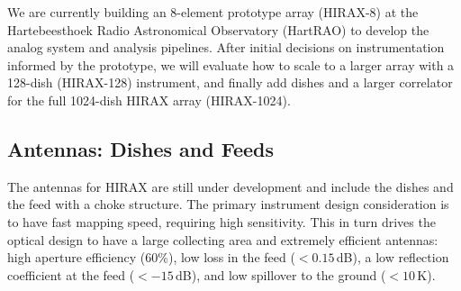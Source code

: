 \documentclass[]{spie}  %
\begin{document}
We are currently building an 8-element prototype array (HIRAX-8) at the Hartebeesthoek Radio Astronomical Observatory (HartRAO) to develop the analog system and analysis pipelines. After initial decisions on instrumentation informed by the prototype, we will evaluate how to scale to a larger array with a 128-dish (HIRAX-128) instrument, and finally add dishes and a larger correlator for the full 1024-dish HIRAX array (HIRAX-1024). \newline

\subsection{Antennas: Dishes and Feeds}

The antennas for HIRAX are still under development and include the dishes and the feed with a choke structure. The primary instrument design consideration is to have fast mapping speed, requiring high sensitivity. This in turn drives the optical design to have a large collecting area and extremely efficient antennas: high aperture efficiency (60\%), low loss in the feed ($<0.15$\,dB), a low reflection coefficient at the feed ($<-15$\,dB), and low spillover to the ground ($<10$\,K). \newline
\end{document}
